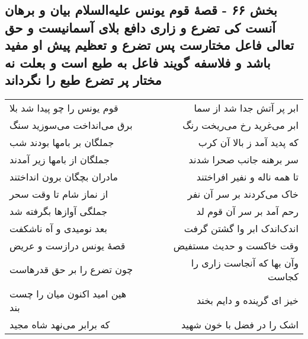 \begin{center}
\section*{بخش ۶۶ - قصهٔ قوم یونس علیه‌السلام بیان و برهان آنست کی تضرع و زاری دافع بلای آسمانیست و حق تعالی فاعل مختارست پس تضرع و تعظیم پیش او مفید باشد و فلاسفه گویند فاعل به طبع است و بعلت نه مختار پر تضرع طبع را نگرداند}
\label{sec:sh066}
\begin{longtable}{l p{0.5cm} r}
قوم یونس را چو پیدا شد بلا
&&
ابر پر آتش جدا شد از سما
\\
برق می‌انداخت می‌سوزید سنگ
&&
ابر می‌غرید رخ می‌ریخت رنگ
\\
جملگان بر بامها بودند شب
&&
که پدید آمد ز بالا آن کرب
\\
جملگان از بامها زیر آمدند
&&
سر برهنه جانب صحرا شدند
\\
مادران بچگان برون انداختند
&&
تا همه ناله و نفیر افراختند
\\
از نماز شام تا وقت سحر
&&
خاک می‌کردند بر سر آن نفر
\\
جملگی آوازها بگرفته شد
&&
رحم آمد بر سر آن قوم لد
\\
بعد نومیدی و آه ناشکفت
&&
اندک‌اندک ابر وا گشتن گرفت
\\
قصهٔ یونس درازست و عریض
&&
وقت خاکست و حدیث مستفیض
\\
چون تضرع را بر حق قدرهاست
&&
وآن بها که آنجاست زاری را کجاست
\\
هین امید اکنون میان را چست بند
&&
خیز ای گرینده و دایم بخند
\\
که برابر می‌نهد شاه مجید
&&
اشک را در فضل با خون شهید
\\
\end{longtable}
\end{center}
